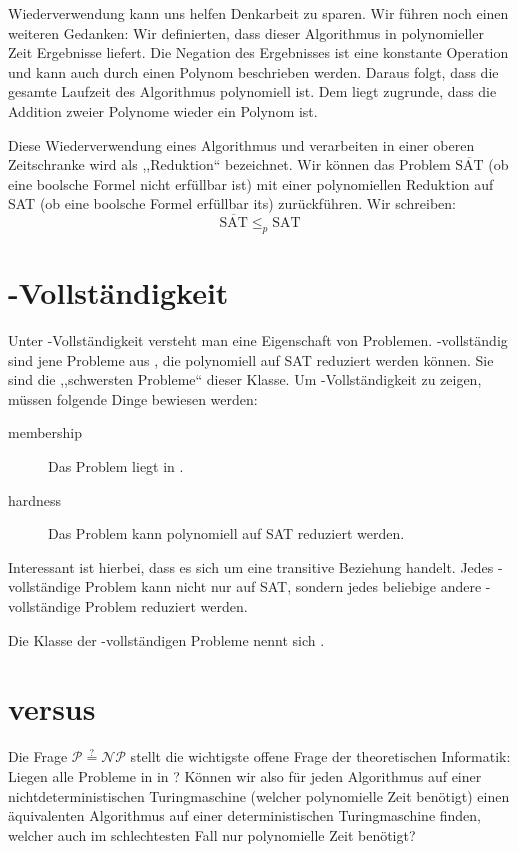 Wiederverwendung kann uns helfen Denkarbeit zu sparen. Wir führen noch einen weiteren Gedanken: Wir definierten, dass dieser Algorithmus in polynomieller Zeit Ergebnisse liefert. Die Negation des Ergebnisses ist eine konstante Operation und kann auch durch einen Polynom beschrieben werden. Daraus folgt, dass die gesamte Laufzeit des Algorithmus polynomiell ist. Dem liegt zugrunde, dass die Addition zweier Polynome wieder ein Polynom ist.

Diese Wiederverwendung eines Algorithmus und verarbeiten in einer oberen Zeitschranke wird als ,,Reduktion`` bezeichnet. Wir können das Problem $\overline{\text{SAT}}$ (ob eine boolsche Formel nicht erfüllbar ist) mit einer polynomiellen Reduktion auf SAT (ob eine boolsche Formel erfüllbar its) zurückführen. Wir schreiben:
\[
    \overline{\text{SAT}} \leq_p \text{SAT}
\]

\section{\cNP{}-Vollständigkeit}
%
Unter \cNP{}-Vollständigkeit versteht man eine Eigenschaft von Problemen. \cNP{}-vollständig sind jene Probleme aus
\cNP{}, die polynomiell auf SAT reduziert werden können. Sie sind die ,,schwersten Probleme`` dieser Klasse. Um \cNP{}-Vollständigkeit zu zeigen, müssen folgende Dinge bewiesen werden:
\begin{description}
  \item[membership] Das Problem liegt in \cNP{}.
  \item[hardness] Das Problem kann polynomiell auf SAT reduziert werden.
\end{description}

Interessant ist hierbei, dass es sich um eine transitive Beziehung handelt. Jedes \cNP{}-vollständige Problem kann nicht nur auf SAT, sondern jedes beliebige andere \cNP{}-vollständige Problem reduziert werden. 

Die Klasse der \cNP{}-vollständigen Probleme nennt sich \cNPC{}.
%
\section{\cP{} versus \cNP{}}
%
Die Frage $\mathcal{P} \stackrel{?}{=} \mathcal{NP}$ stellt die wichtigste offene Frage der theoretischen Informatik: Liegen alle Probleme in \cNP{} in \cP{}? Können wir also für jeden Algorithmus auf einer nichtdeterministischen Turingmaschine (welcher polynomielle Zeit benötigt) einen äquivalenten Algorithmus auf einer deterministischen Turingmaschine finden, welcher auch im schlechtesten Fall nur polynomielle Zeit benötigt?

